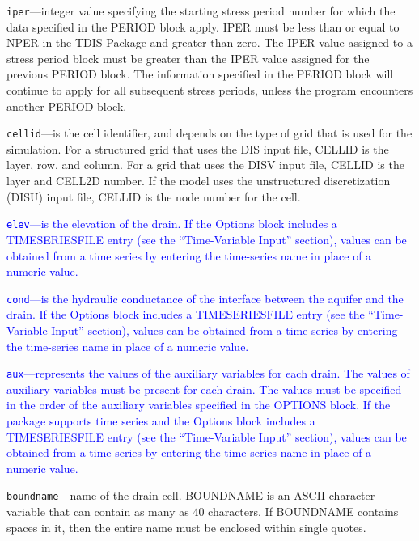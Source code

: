 \begin{description}
\item \texttt{iper}---integer value specifying the starting stress period number for which the data specified in the PERIOD block apply.  IPER must be less than or equal to NPER in the TDIS Package and greater than zero.  The IPER value assigned to a stress period block must be greater than the IPER value assigned for the previous PERIOD block.  The information specified in the PERIOD block will continue to apply for all subsequent stress periods, unless the program encounters another PERIOD block.

\item \texttt{cellid}---is the cell identifier, and depends on the type of grid that is used for the simulation.  For a structured grid that uses the DIS input file, CELLID is the layer, row, and column.   For a grid that uses the DISV input file, CELLID is the layer and CELL2D number.  If the model uses the unstructured discretization (DISU) input file, CELLID is the node number for the cell.

\item \textcolor{blue}{\texttt{elev}---is the elevation of the drain. If the Options block includes a TIMESERIESFILE entry (see the ``Time-Variable Input'' section), values can be obtained from a time series by entering the time-series name in place of a numeric value.}

\item \textcolor{blue}{\texttt{cond}---is the hydraulic conductance of the interface between the aquifer and the drain. If the Options block includes a TIMESERIESFILE entry (see the ``Time-Variable Input'' section), values can be obtained from a time series by entering the time-series name in place of a numeric value.}

\item \textcolor{blue}{\texttt{aux}---represents the values of the auxiliary variables for each drain. The values of auxiliary variables must be present for each drain. The values must be specified in the order of the auxiliary variables specified in the OPTIONS block.  If the package supports time series and the Options block includes a TIMESERIESFILE entry (see the ``Time-Variable Input'' section), values can be obtained from a time series by entering the time-series name in place of a numeric value.}

\item \texttt{boundname}---name of the drain cell.  BOUNDNAME is an ASCII character variable that can contain as many as 40 characters.  If BOUNDNAME contains spaces in it, then the entire name must be enclosed within single quotes.

\end{description}

